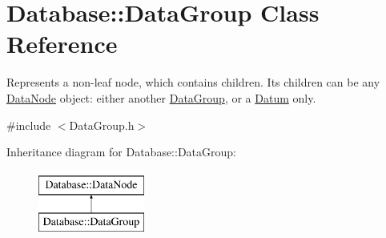 \hypertarget{classDatabase_1_1DataGroup}{}\section{Database\+:\+:Data\+Group Class Reference}
\label{classDatabase_1_1DataGroup}


Represents a non-\/leaf node, which contains children. Its children can be any \hyperlink{classDatabase_1_1DataNode}{Data\+Node} object\+: either another \hyperlink{classDatabase_1_1DataGroup}{Data\+Group}, or a \hyperlink{classDatabase_1_1Datum}{Datum} only.  




{\ttfamily \#include $<$Data\+Group.\+h$>$}

Inheritance diagram for Database\+:\+:Data\+Group\+:\begin{figure}[H]
\begin{center}
\leavevmode
\includegraphics[height=2.000000cm]{classDatabase_1_1DataGroup}
\end{center}
\end{figure}
